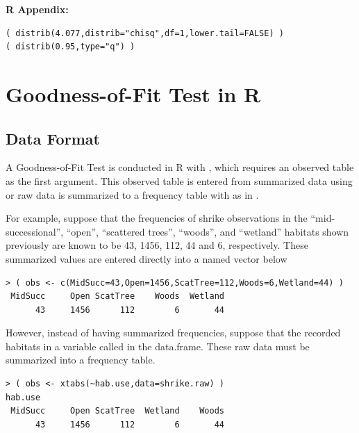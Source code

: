 \documentclass[10pt,openany]{book}\usepackage[]{graphicx}\usepackage[]{color}
\makeatletter
\newenvironment{kframe}{%
 \def\at@end@of@kframe{}%
 \ifinner\ifhmode%
  \def\at@end@of@kframe{\end{minipage}}%
  \begin{minipage}{\columnwidth}%
 \fi\fi%
 \def\FrameCommand##1{\hskip\@totalleftmargin \hskip-\fboxsep
 \colorbox{shadecolor}{##1}\hskip-\fboxsep
     \hskip-\linewidth \hskip-\@totalleftmargin \hskip\columnwidth}%
 \MakeFramed {\advance\hsize-\width
   \@totalleftmargin\z@ \linewidth\hsize
   \@setminipage}}%
 {\par\unskip\endMakeFramed%
 \at@end@of@kframe}
\newenvironment{knitrout}{}{} %
\makeatother
\begin{document}
\begin{minipage}{\textwidth}
\textbf{R Appendix:}
\begin{knitrout}
\color{fgcolor}\begin{kframe}
\begin{verbatim}
( distrib(4.077,distrib="chisq",df=1,lower.tail=FALSE) )
( distrib(0.95,type="q") )
\end{verbatim}
\end{kframe}
\end{knitrout}
\end{minipage}


\section{Goodness-of-Fit Test in R}
\subsection{Data Format}
A Goodness-of-Fit Test is conducted in R with , which requires an observed table as the first argument. This observed table is entered from summarized data using  or raw data is summarized to a frequency table with  as in .

For example, suppose that the frequencies of shrike observations in the ``mid-successional'', ``open'', ``scattered trees'', ``woods'', and ``wetland'' habitats shown previously are known to be 43, 1456, 112, 44 and 6, respectively. These summarized values are entered directly into a named vector below
\begin{knitrout}
\color{fgcolor}\begin{kframe}
\begin{verbatim}
> ( obs <- c(MidSucc=43,Open=1456,ScatTree=112,Woods=6,Wetland=44) )
 MidSucc     Open ScatTree    Woods  Wetland 
      43     1456      112        6       44 
\end{verbatim}
\end{kframe}
\end{knitrout}


However, instead of having summarized frequencies, suppose that the recorded habitats in a variable called  in the  data.frame. These raw data must be summarized into a frequency table.
\begin{knitrout}
\color{fgcolor}\begin{kframe}
\begin{verbatim}
> ( obs <- xtabs(~hab.use,data=shrike.raw) )
hab.use
 MidSucc     Open ScatTree  Wetland    Woods 
      43     1456      112        6       44 
\end{verbatim}
\end{kframe}
\end{knitrout}
\end{document}

